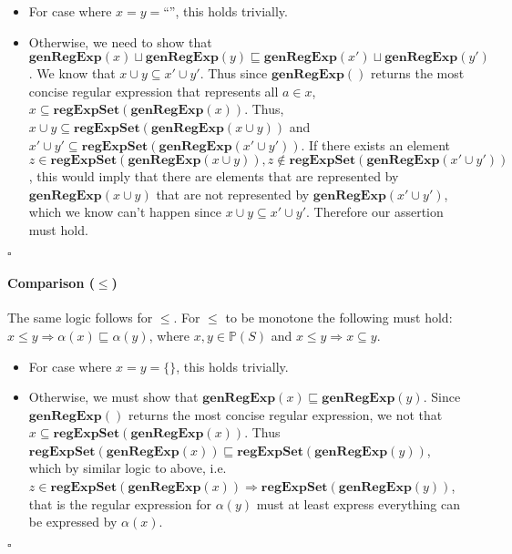\documentclass{article}
\newcommand{\powerset}[1]{\mathbb{P}(#1)}
\newcommand{\regExpSet}[1]{\mathbf{regExpSet}(#1)}
\newcommand{\genRegExp}[1]{\mathbf{genRegExp}(#1)}
\begin{document}
\begin{itemize}
	\item For case where $x = y = \text{``''}$, this holds trivially.
	\item Otherwise, we need to show that $\genRegExp{x} \sqcup \genRegExp{y} \sqsubseteq  \genRegExp{x'} \sqcup \genRegExp{y'}$.  We know that $x \cup y \subseteq x' \cup y'$.  Thus since $\genRegExp{}$ returns the most concise regular expression that represents all $a \in x$, $x \subseteq \regExpSet{\genRegExp{x}}$. Thus, $x \cup y \subseteq \regExpSet{\genRegExp{x \cup y}}$ and $x' \cup y' \subseteq \regExpSet{\genRegExp{x' \cup y'}}$.  If there exists an element $z \in \regExpSet{\genRegExp{x \cup y}}, z \notin \regExpSet{\genRegExp{x' \cup y'}}$, this would imply that there are elements that are represented by $\genRegExp{x \cup y}$ that are not represented by $\genRegExp{x' \cup y'}$, which we know can't happen since $x \cup y \subseteq x' \cup y'$.  Therefore our assertion must hold.
\end{itemize}
$\square$

\paragraph{Comparison ($\leq$)}
The same logic follows for $\leq$. For $\leq$ to be monotone the following must hold: $x \leq y \Rightarrow  \alpha(x) \sqsubseteq \alpha(y)$, where $x,y \in \powerset{S}$ and $x \leq y \Rightarrow x \subseteq y$.
\begin{itemize}
	\item For case where $x = y = \{\}$, this holds trivially.
	\item Otherwise, we must show that $\genRegExp{x} \sqsubseteq \genRegExp{y}$. Since $\genRegExp{}$ returns the most concise regular expression, we not that $x \subseteq \regExpSet{\genRegExp{x}}$.  Thus $\regExpSet{\genRegExp{x}} \sqsubseteq \regExpSet{\genRegExp{y}}$, which by similar logic to above, i.e. $z \in \regExpSet{\genRegExp{x}} \Rightarrow \regExpSet{\genRegExp{y}}$, that is the regular expression for $\alpha(y)$ must at least express everything can be expressed by $\alpha(x)$.
\end{itemize}
$\square$
\end{document}

